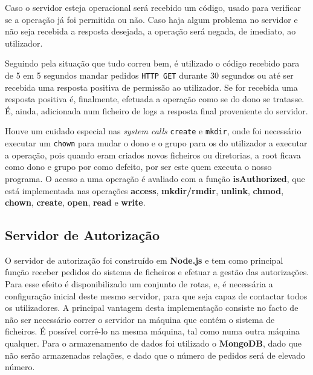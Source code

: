 Caso o servidor esteja operacional será recebido um código, usado para verificar se a operação já foi permitida ou não. Caso haja algum problema no servidor e não seja recebida a resposta desejada, a operação será negada, de imediato, ao utilizador. 

Seguindo pela situação que tudo correu bem, é utilizado o código recebido para de 5 em 5 segundos mandar pedidos \texttt{HTTP GET} durante 30 segundos ou até ser recebida uma resposta positiva de permissão ao utilizador. Se for recebida uma resposta positiva é, finalmente, efetuada a operação como se do dono se tratasse. É, ainda, adicionada num ficheiro de logs a resposta final proveniente do servidor.

Houve um cuidado especial nas \textit{system calls} \texttt{create} e \texttt{mkdir}, onde foi necessário executar um \texttt{chown} para mudar o dono e o grupo para os do utilizador a executar a operação, pois quando eram criados novos ficheiros ou diretorias, a root ficava como dono e grupo por como defeito, por ser este quem executa o nosso programa. O acesso a uma operação é avaliado com a função \textbf{isAuthorized}, que está implementada nas operações \textbf{access}, \textbf{mkdir/rmdir}, \textbf{unlink}, \textbf{chmod}, \textbf{chown}, \textbf{create}, \textbf{open}, \textbf{read} e \textbf{write}.



\subsection{Servidor de Autorização}

O servidor de autorização foi construído em \textbf{Node.js} e tem como principal função receber pedidos do sistema de ficheiros e efetuar a gestão das autorizações. Para esse efeito é disponibilizado um conjunto de rotas, e, é necessária a configuração inicial deste mesmo servidor, para que seja capaz de contactar todos os utilizadores. A principal vantagem desta implementação consiste no facto de não ser necessário correr o servidor na máquina que contém o sistema de ficheiros. É possível corrê-lo na mesma máquina, tal como numa outra máquina qualquer. Para o armazenamento de dados foi utilizado o \textbf{MongoDB}, dado que não serão armazenadas relações, e dado que o número de pedidos será de elevado número.

